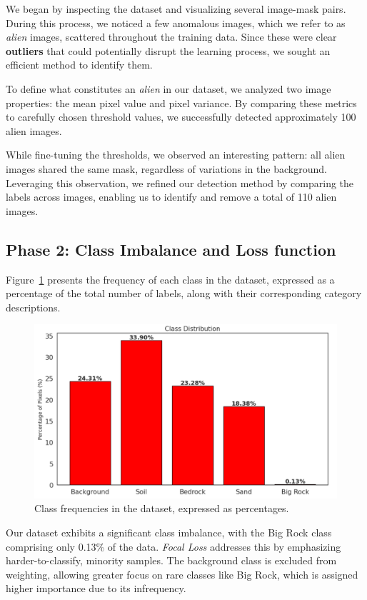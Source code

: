 \documentclass[11pt]{article}
\begin{document}
\begin{multicols*}{2}
    We began by inspecting the dataset and visualizing several image-mask pairs. During this process, we noticed a few anomalous images, which we refer to as \emph{alien} images, scattered throughout the training data. Since these were clear \textbf{outliers} that could potentially disrupt the learning process, we sought an efficient method to identify them.
    
    To define what constitutes an \emph{alien} in our dataset, we analyzed two image properties: the mean pixel value and pixel variance. By comparing these metrics to carefully chosen threshold values, we successfully detected approximately 100 alien images.
    
    While fine-tuning the thresholds, we observed an interesting pattern: all alien images shared the same mask, regardless of variations in the background. Leveraging this observation, we refined our detection method by comparing the labels across images, enabling us to identify and remove a total of 110 alien images.

    \subsection{Phase 2: Class Imbalance and Loss function}

    Figure~\ref{fig:freq} presents the frequency of each class in the dataset, expressed as a percentage of the total number of labels, along with their corresponding category descriptions.

    \begin{figure}[H]
    \centering
    \includegraphics[width=0.8\linewidth]{figures/freq.png}
    \caption{Class frequencies in the dataset, expressed as percentages.}
    \label{fig:freq}
    \end{figure}
    
    \noindent Our dataset exhibits a significant class imbalance, with the Big Rock class comprising only 0.13\% of the data. \textit{Focal Loss} addresses this by emphasizing harder-to-classify, minority samples. The background class is excluded from weighting, allowing greater focus on rare classes like Big Rock, which is assigned higher importance due to its infrequency.


\end{multicols*}
\end{document}
